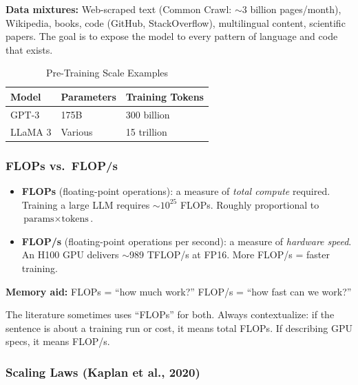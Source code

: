 \documentclass[11pt, a4paper]{article}
\begin{document}
\textbf{Data mixtures:} Web-scraped text (Common Crawl: $\sim$3 billion pages/month), Wikipedia, books, code (GitHub, StackOverflow), multilingual content, scientific papers. The goal is to expose the model to every pattern of language and code that exists.

\begin{table}[h]
\centering
\caption{Pre-Training Scale Examples}
\begin{tabular}{@{}lll@{}}
\toprule
\textbf{Model} & \textbf{Parameters} & \textbf{Training Tokens} \\
\midrule
GPT-3 & 175B & 300 billion \\
LLaMA 3 & Various & 15 trillion \\
\bottomrule
\end{tabular}
\end{table}

\subsubsection{FLOPs vs.\ FLOP/s}

\begin{defbox}
\begin{itemize}[leftmargin=1.5em]
  \item \textbf{FLOPs} (floating-point operations): a measure of \emph{total compute} required. Training a large LLM requires $\sim 10^{25}$ FLOPs. Roughly proportional to $\text{params} \times \text{tokens}$.
  \item \textbf{FLOP/s} (floating-point operations per second): a measure of \emph{hardware speed}. An H100 GPU delivers $\sim$989 TFLOP/s at FP16. More FLOP/s = faster training.
\end{itemize}
\textbf{Memory aid:} FLOPs = ``how much work?'' FLOP/s = ``how fast can we work?''
\end{defbox}

\begin{warnbox}
The literature sometimes uses ``FLOPs'' for both. Always contextualize: if the sentence is about a training run or cost, it means total FLOPs. If describing GPU specs, it means FLOP/s.
\end{warnbox}

\subsubsection{Scaling Laws (Kaplan et al., 2020)}
\end{document}
